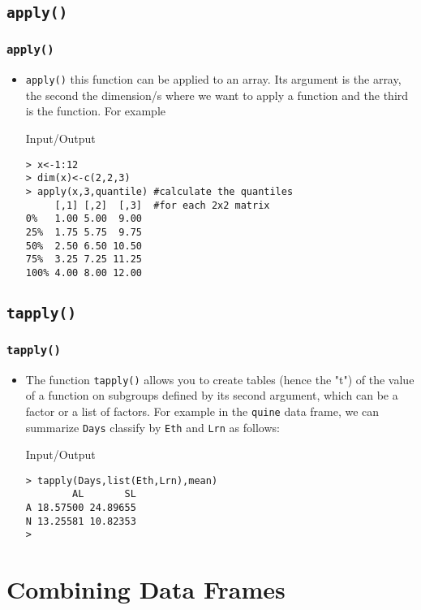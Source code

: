 \documentclass[xcolor={table},c]{beamer}
\begin{document}
\subsection{\texttt{apply()}}
\begin{frame}[fragile]\frametitle{\texttt{apply()}}
\begin{itemize}
\item \texttt{apply()} this function can be applied to an array. Its argument is the array, the second the dimension/s where we want to apply a function and the third is the function. For example
\begin{exampleblock}{Input/Output}
\begin{verbatim}
> x<-1:12
> dim(x)<-c(2,2,3)
> apply(x,3,quantile) #calculate the quantiles 
     [,1] [,2]  [,3]  #for each 2x2 matrix
0%   1.00 5.00  9.00
25%  1.75 5.75  9.75
50%  2.50 6.50 10.50
75%  3.25 7.25 11.25
100% 4.00 8.00 12.00
\end{verbatim}
\end{exampleblock}
\end{itemize}
\end{frame}

\subsection{\texttt{tapply()}}
\begin{frame}[fragile]\frametitle{\texttt{tapply()}}
\begin{itemize}
\item The function \texttt{tapply()} allows you to create tables (hence the "t") of the value of a function on subgroups defined by its second argument, which can be a factor or a list of factors.
For example in the \texttt{quine} data frame, we can  summarize \texttt{Days} classify by \texttt{Eth} and \texttt{Lrn} as follows:
\begin{exampleblock}{Input/Output}\small
\begin{verbatim}
> tapply(Days,list(Eth,Lrn),mean)
        AL       SL
A 18.57500 24.89655
N 13.25581 10.82353
>
\end{verbatim}
\end{exampleblock}
\end{itemize}
\end{frame}

\section{Combining Data Frames}
\end{document}
